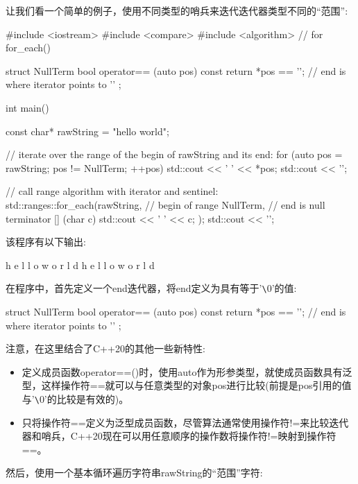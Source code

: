 让我们看一个简单的例子，使用不同类型的哨兵来迭代迭代器类型不同的“范围”:


\begin{cpp}
#include <iostream>
#include <compare>
#include <algorithm> // for for_each()

struct NullTerm {
	bool operator== (auto pos) const {
		return *pos == '\0'; // end is where iterator points to ’\0’
	}
};

int main()
{
	const char* rawString = "hello world";
	
	// iterate over the range of the begin of rawString and its end:
	for (auto pos = rawString; pos != NullTerm{}; ++pos) {
		std::cout << ' ' << *pos;
	}
	std::cout << '\n';
	
	// call range algorithm with iterator and sentinel:
	std::ranges::for_each(rawString, // begin of range
				NullTerm{}, // end is null terminator
				[] (char c) {
					std::cout << ' ' << c;
				});
	std::cout << '\n';
}
\end{cpp}

该程序有以下输出:

\begin{shell}
h e l l o   w o r l d
h e l l o   w o r l d
\end{shell}

在程序中，首先定义一个end迭代器，将end定义为具有等于'\verb|\|0'的值:

\begin{cpp}
struct NullTerm {
	bool operator== (auto pos) const {
		return *pos == '\0'; // end is where iterator points to ’\0’
	}
};
\end{cpp}

注意，在这里结合了C++20的其他一些新特性:

\begin{itemize}
\item
定义成员函数operator==()时，使用auto作为形参类型，就使成员函数具有泛型，这样操作符==就可以与任意类型的对象pos进行比较(前提是pos引用的值与'\verb|\|0'的比较是有效的)。

\item
只将操作符==定义为泛型成员函数，尽管算法通常使用操作符!=来比较迭代器和哨兵，C++20现在可以用任意顺序的操作数将操作符!=映射到操作符==。
\end{itemize}


然后，使用一个基本循环遍历字符串rawString的“范围”字符:

